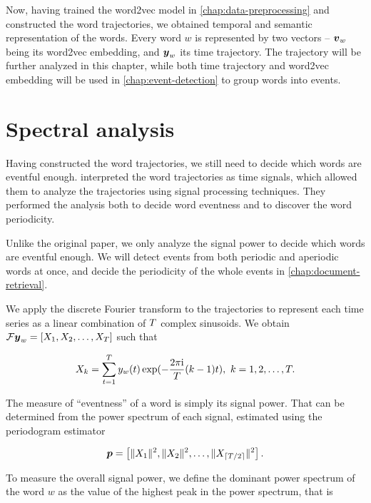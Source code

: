 Now, having trained the word2vec model in \autoref{chap:data-preprocessing} and constructed the word trajectories, we obtained temporal and semantic representation of the words. Every word $w$ is represented by two vectors -- $\embed_{w}$ being its word2vec embedding, and $\vect{\traj}_{w}$ its time trajectory. The trajectory will be further analyzed in this chapter, while both time trajectory and word2vec embedding will be used in \autoref{chap:event-detection} to group words into events.


\section{Spectral analysis}
Having constructed the word trajectories, we still need to decide which words are eventful enough. \cite{event-detection} interpreted the word trajectories as time signals, which allowed them to analyze the trajectories using signal processing techniques. They performed the analysis both to decide word eventness and to discover the word periodicity.

Unlike the original paper, we only analyze the signal power to decide which words are eventful enough. We will detect events from both periodic and aperiodic words at once, and decide the periodicity of the whole events in \autoref{chap:document-retrieval}.

We apply the discrete Fourier transform to the trajectories to represent each time series as a linear combination of $T$ complex sinusoids. We obtain $\mathcal{F} \vect{\traj}_{w} = \left[ X_{1}, X_{2}, \dots, X_{\streamlen}\right ]$ such that

\begin{equation*}
	X_{k} = \sum_{t = 1}^{T}{y_{w}(t) \exp(- \frac{2 \pi \mathrm{i}}{T} (k - 1) t}), ~ k = 1, 2, \dots, T.
\end{equation*}

The measure of ``eventness'' of a word is simply its signal power. That can be determined from the power spectrum of each signal, estimated using the periodogram estimator

\begin{equation*}
	\vect{P} = \left[ \|X_{1}\|^{2}, \|X_{2}\|^{2}, \dots, \|X_{\ceil{\streamlen / 2}}\|^{2} \right].
\end{equation*}

To measure the overall signal power, we define the dominant power spectrum of the word $w$ as the value of the highest peak in the power spectrum, that is

